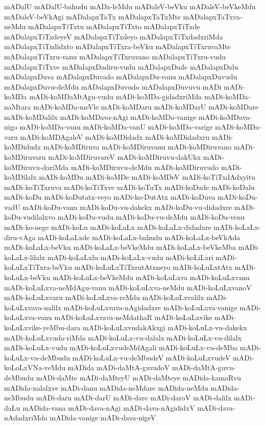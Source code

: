 {mADalU
mADalU-bahudu
mADa-leMdu
mADaleV-beVku
mADaleV-beVkeMdu
mADaleV-beVkAgi
mADalapxTaTx
mADalapxTaTxMte
mADalapxTaTxva-neMdu
mADalapxTiTxtu
mADalapxTiTxto
mADalapxTiTxde
mADalapxTiTxdeyeV
mADalapxTiTxdeyo
mADalapxTiTxdadxriMda
mADalapxTiTxdidxto
mADalapxTiTxra-beVku
mADalapxTiTxruvaMte
mADalapxTiTxru-vanu
mADalapxTiTxruvano
mADalapxTiTxru-vudu
mADalapxTiTxve
mADalapxDadiru-vudu
mADalapxDade
mADalapxDalu
mADalapxDuva
mADalapxDuvado
mADalapxDu-vanu
mADalapxDuvudu
mADalapxDuvu-deMdu
mADalapxDuvudo
mADalapxDuvuvu
mADi
mADi-koMDa
mADi-koMDaMtAgu-vudu
mADi-koMDa-gidadxriMda
mADi-koMDa-naMtara
mADi-koMDa-meVle
mADi-koMDaru
mADi-koMDarU
mADi-koMDare
mADi-koMDalilx
mADi-koMDava-nAgi
mADi-koMDa-vanige
mADi-koMDava-nigo
mADi-koMDa-vanu
mADi-koMDa-vanU
mADi-koMDa-varige
mADi-koMDa-varu
mADi-koMDAgaleV
mADi-koMDidadx
mADi-koMDidadxru
mADi-koMDidudx
mADi-koMDiruva
mADi-koMDiruvanu
mADi-koMDiruvano
mADi-koMDiruvaru
mADi-koMDiruvareV
mADi-koMDiruvu-dakUkx
mADi-koMDiruvu-dariMda
mADi-koMDiruvu-deMdu
mADi-koMDiruvudo
mADi-koMDilalx
mADi-koMDu
mADi-koMDe
mADi-koMDeV
mADi-koTiTxdAdxyitu
mADi-koTiTxruva
mADi-koTiTxve
mADi-koTuTx
mADi-koDade
mADi-koDalu
mADi-koDu
mADi-koDutatx-veyo
mADi-ko-DutAtx
mADi-koDuva
mADi-koDu-vadU
mADi-koDu-vanu
mADi-koDu-vu-dakekx
mADi-koDu-vu-didadxre
mADi-koDu-vudilalxvo
mADi-koDu-vudu
mADi-koDu-vu-deMdu
mADi-koDu-venu
mADi-ko-nege
mADi-koLu
mADi-koLaLx
mADi-koLaLx-didadxre
mADi-koLaLx-diru-vAga
mADi-koLaLxde
mADi-koLaLx-bahudu
mADi-koLaLx-beVkAda
mADi-koLaLx-beVku
mADi-koLaLx-beVkeMdu
mADi-koLaLx-beVkeMba
mADi-koLaLx-lilalx
mADi-koLaLxlu
mADi-koLaLx-vudu
mADi-koLiLxri
mADi-koLuLxTiTxra-beVku
mADi-koLuLxTiTxrutAtxneyo
mADi-koLuLxtAtx
mADi-koLuLx-beVku
mADi-koLuLx-beVkeMdu
mADi-koLuLxva
mADi-koLuLxvanu
mADi-koLuLxva-neMdAgu-vanu
mADi-koLuLxva-neMdu
mADi-koLuLxvanoV
mADi-koLuLxvaru
mADi-koLuLxva-reMdu
mADi-koLuLxvalilx
mADi-koLuLxvava-nalilx
mADi-koLuLxvava-nAgidadxre
mADi-koLuLxva-vanige
mADi-koLuLxva-vanu
mADi-koLuLxvava-neMdathaR
mADi-koLuLxvike
mADi-koLuLxvike-yeMbu-dara
mADi-koLuLxvudakAkxgi
mADi-koLuLx-vu-dakekx
mADi-koLuLxvuda-riMda
mADi-koLuLx-vu-dalalx
mADi-koLuLx-vu-dilalx
mADi-koLuLx-vudu
mADi-koLuLxvudeMdAgali
mADi-koLuLx-vu-deMba
mADi-koLuLx-vu-deMbudu
mADi-koLuLx-vu-deMbudeV
mADi-koLuLxvudeV
mADi-koLoLxVNa-veMdu
mADida
mADi-daMtA-guvadoV
mADi-daMtA-guvu-deMbudu
mADi-daMte
mADi-daMteyU
mADi-daMteye
mADida-kamaRvu
mADida-nalalxve
mADi-danu
mADida-neMdare
mADida-neMdu
mADida-neMbudu
mADi-daru
mADi-darU
mADi-dare
mADi-daroV
mADi-dalilx
mADi-daLu
mADida-vana
mADi-dava-nAgi
mADi-dava-nAgididxV
mADi-dava-nAdadxriMda
mADida-vanige
mADi-dava-nigeV
}
